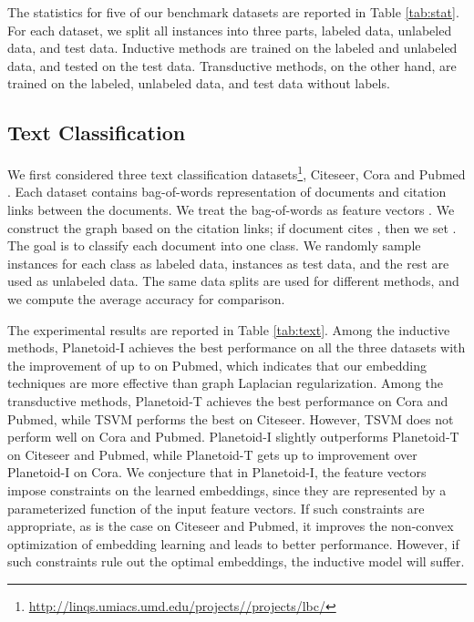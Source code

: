 The statistics for five of our benchmark datasets are reported in Table \ref{tab:stat}.
For each dataset, we split all instances into three parts, labeled data, unlabeled data, and test data. Inductive methods are trained on the labeled and unlabeled data, and tested on the test data. Transductive methods, on the other hand, are trained on the labeled, unlabeled data, and test data without labels.






\subsection{Text Classification}



We first considered three text classification datasets\footnote{\url{http://linqs.umiacs.umd.edu/projects//projects/lbc/}}, Citeseer, Cora and Pubmed \cite{sen2008collective}. Each dataset contains bag-of-words representation of documents and citation links between the documents. We treat the bag-of-words as feature vectors . We construct the graph  based on the citation links; if document  cites , then we set . The goal is to classify each document into one class.
We randomly sample  instances for each class as labeled data,  instances as test data, and the rest are used as unlabeled data. The same data splits are used for different methods, and we compute the average accuracy for comparison.

The experimental results are reported in Table \ref{tab:text}. Among the inductive methods, Planetoid-I achieves the best performance on all the three datasets with the improvement of up to  on Pubmed, which indicates that our embedding techniques are more effective than graph Laplacian regularization.
Among the transductive methods, Planetoid-T achieves the best performance on Cora and Pubmed, while TSVM performs the best on Citeseer. However, TSVM does not perform well on Cora and Pubmed. 
Planetoid-I slightly outperforms Planetoid-T on Citeseer and Pubmed, while Planetoid-T gets up to  improvement over Planetoid-I on Cora. We conjecture that in Planetoid-I, the feature vectors impose constraints on the learned embeddings, since they are represented by a parameterized function of the input feature vectors. If such constraints are appropriate, as is the case on Citeseer and Pubmed, it improves the non-convex optimization of embedding learning and leads to better performance. However, if such constraints rule out the optimal embeddings, the inductive model will suffer.

